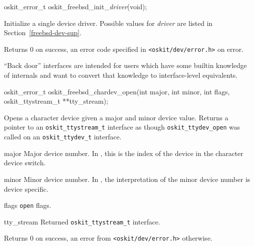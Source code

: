 \begin{apisyn}

	\funcproto oskit_error_t oskit_freebsd_init_\emph{driver}(void);
\end{apisyn}
\ostodrv
\begin{apidesc}
	Initialize a single \freebsd{} device driver.
	Possible values for \emph{driver} are listed in
	Section~\ref{freebsd-dev-sup}.
\end{apidesc}
\begin{apiret}
	Returns 0 on success,
	an error code specified in {\tt <oskit/dev/error.h>} on error.
\end{apiret}


``Back door'' interfaces are intended for users which have some builtin
knowledge of \freebsd{} internals and want to convert that knowledge to
interface-level equivalents.

\begin{apisyn}

	\funcproto oskit_error_t oskit_freebsd_chardev_open(int major, int minor,
				int flags,
				\outparam oskit_ttystream_t **tty_stream);
\end{apisyn}
\ostodrv
\begin{apidesc}
	Opens a character device given a
	\freebsd{} major and minor device value.
	Returns a pointer to an {\tt oskit_ttystream_t} interface as though
	{\tt oskit_ttydev_open} was called on an \oskit{} {\tt oskit_ttydev_t} interface.
\end{apidesc}
\begin{apiparm}
	\item[major]
		Major device number.
		In \freebsd, this is the index of the device
		in the character device switch.
	\item[minor]
		Minor device number.
		In \freebsd, the interpretation of the minor device number
		is device specific.
	\item[flags]
		\posix{} {\tt open} flags.
	\item[tty_stream]
		Returned {\tt oskit_ttystream_t} interface.
\end{apiparm}
\begin{apiret}
	Returns 0 on success,
	an error from {\tt <oskit/dev/error.h>} otherwise.
\end{apiret}

